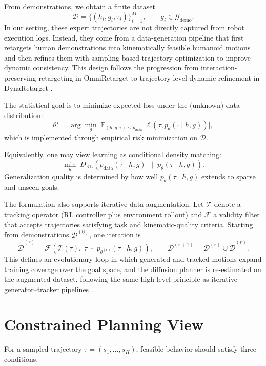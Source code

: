 From demonstrations, we obtain a finite dataset
\[
\mathcal{D}=\{(h_i,g_i,\tau_i)\}_{i=1}^{M}, \qquad g_i \in \mathcal{G}_{\mathrm{demo}}.
\]
In our setting, these expert trajectories are not directly captured from robot execution logs. Instead, they come from a data-generation pipeline that first retargets human demonstrations into kinematically feasible humanoid motions and then refines them with sampling-based trajectory optimization to improve dynamic consistency. This design follows the progression from interaction-preserving retargeting in OmniRetarget to trajectory-level dynamic refinement in DynaRetarget \cite{omniretarget,dynaretarget}.

The statistical goal is to minimize expected loss under the (unknown) data distribution:
\[
\theta^{\star} = \arg\min_{\theta}\; \mathbb{E}_{(h,g,\tau)\sim p_{\mathrm{data}}}\big[\ell(\tau, p_{\theta}(\cdot\mid h,g))\big],
\]
which is implemented through empirical risk minimization on $\mathcal{D}$.

Equivalently, one may view learning as conditional density matching:
\[
\min_{\theta}\; D_{\mathrm{KL}}\!\left(p_{\mathrm{data}}(\tau\mid h,g)\;\|\;p_{\theta}(\tau\mid h,g)\right).
\]
Generalization quality is determined by how well $p_{\theta}(\tau\mid h,g)$ extends to sparse and unseen goals.

The formulation also supports iterative data augmentation. Let $\mathcal{T}$ denote a tracking operator (RL controller plus environment rollout) and $\mathcal{F}$ a validity filter that accepts trajectories satisfying task and kinematic-quality criteria. Starting from demonstrations $\mathcal{D}^{(0)}$, one iteration is
\[
\tilde{\mathcal{D}}^{(r)}=\mathcal{F}\!\left(\mathcal{T}(\tau),\; \tau\sim p_{\theta^{(r)}}(\tau\mid h,g)\right),
\qquad
\mathcal{D}^{(r+1)}=\mathcal{D}^{(r)}\cup\tilde{\mathcal{D}}^{(r)}.
\]
This defines an evolutionary loop in which generated-and-tracked motions expand training coverage over the goal space, and the diffusion planner is re-estimated on the augmented dataset, following the same high-level principle as iterative generator--tracker pipelines \cite{xu2025parc}.

\section{Constrained Planning View}

For a sampled trajectory $\tau=(s_{1},\dots,s_{H})$, feasible behavior should satisfy three conditions.

